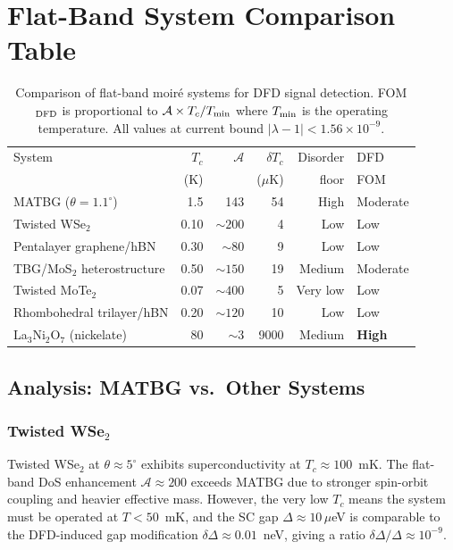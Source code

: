 \documentclass[11pt]{article}
\newcommand{\ee}[1]{\times 10^{#1}}
\newcommand{\lambdabound}{1.56\ee{-9}}
\begin{document}
\section{Flat-Band System Comparison Table}
\label{sec:comparison}

\begin{table}[h!]
\centering
\caption{Comparison of flat-band moiré systems for DFD signal detection.
FOM$_{\rm DFD}$ is proportional to $\mathcal{A} \times T_c / T_{\rm min}$
where $T_{\rm min}$ is the operating temperature.
All values at current bound $|\lambda-1| < \lambdabound$.}
\label{tab:flatband_comparison}
\renewcommand{\arraystretch}{1.3}
\begin{tabular}{p{3.8cm}rrrrl}
\toprule
System & $T_c$ & $\mathcal{A}$ & $\delta T_c$ & Disorder & DFD \\
       & (K) & & ($\mu$K) & floor & FOM \\
\midrule
MATBG ($\theta=1.1^\circ$) & 1.5 & 143 & 54 & High & Moderate \\
Twisted WSe$_2$ & 0.10 & $\sim 200$ & 4 & Low & Low \\
Pentalayer graphene/hBN & 0.30 & $\sim 80$ & 9 & Low & Low \\
TBG/MoS$_2$ heterostructure & 0.50 & $\sim 150$ & 19 & Medium & Moderate \\
Twisted MoTe$_2$ & 0.07 & $\sim 400$ & 5 & Very low & Low \\
Rhombohedral trilayer/hBN & 0.20 & $\sim 120$ & 10 & Low & Low \\
La$_3$Ni$_2$O$_7$ (nickelate) & 80 & $\sim 3$ & 9000 & Medium & \textbf{High} \\
\bottomrule
\end{tabular}
\end{table}

\subsection{Analysis: MATBG vs.\ Other Systems}

\subsubsection{Twisted WSe$_2$}

Twisted WSe$_2$ at $\theta \approx 5^\circ$ exhibits superconductivity at
$T_c \approx 100$~mK. The flat-band DoS enhancement $\mathcal{A} \approx 200$
exceeds MATBG due to stronger spin-orbit coupling and heavier effective mass.
However, the very low $T_c$ means the system must be operated at
$T < 50$~mK, and the SC gap $\Delta \approx 10\,\mu$eV is comparable to the
DFD-induced gap modification $\delta\Delta \approx 0.01$~neV, giving a
ratio $\delta\Delta/\Delta \approx 10^{-9}$.
\end{document}

